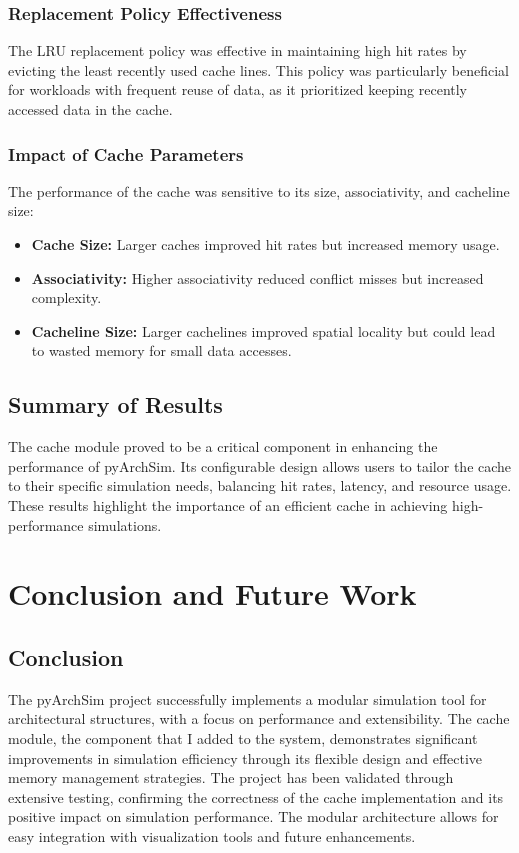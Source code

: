 \documentclass[12pt,a4paper]{report}
\begin{document}
\subsubsection{Replacement Policy Effectiveness}
The LRU replacement policy was effective in maintaining high hit rates by evicting the least recently used cache lines. This policy was particularly beneficial for workloads with frequent reuse of data, as it prioritized keeping recently accessed data in the cache.

\subsubsection{Impact of Cache Parameters}
The performance of the cache was sensitive to its size, associativity, and cacheline size:
\begin{itemize}
  \item \textbf{Cache Size:} Larger caches improved hit rates but increased memory usage.
  \item \textbf{Associativity:} Higher associativity reduced conflict misses but increased complexity.
  \item \textbf{Cacheline Size:} Larger cachelines improved spatial locality but could lead to wasted memory for small data accesses.
\end{itemize}

\subsection{Summary of Results}
The cache module proved to be a critical component in enhancing the performance of pyArchSim. Its configurable design allows users to tailor the cache to their specific simulation needs, balancing hit rates, latency, and resource usage. These results highlight the importance of an efficient cache in achieving high-performance simulations.


\section{Conclusion and Future Work}
\subsection{Conclusion}
The pyArchSim project successfully implements a modular simulation tool for architectural structures, with a focus on performance and extensibility. The cache module, the component that I added to the system, demonstrates significant improvements in simulation efficiency through its flexible design and effective memory management strategies.
The project has been validated through extensive testing, confirming the correctness of the cache implementation and its positive impact on simulation performance. The modular architecture allows for easy integration with visualization tools and future enhancements.
\end{document}
